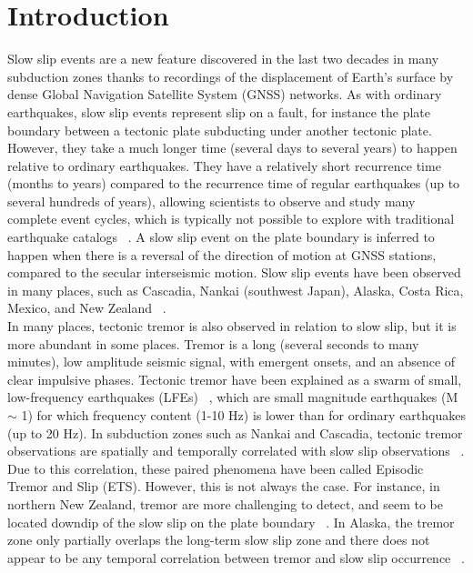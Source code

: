 \documentclass{article}
\begin{document}
\section{Introduction}

Slow slip events are a new feature discovered in the last two decades in many subduction zones thanks to recordings of the displacement of Earth's surface by dense Global Navigation Satellite System (GNSS) networks. As with ordinary earthquakes, slow slip events represent slip on a fault, for instance the plate boundary between a tectonic plate subducting under another tectonic plate. However, they take a much longer time (several days to several years) to happen relative to ordinary earthquakes. They have a relatively short recurrence time (months to years) compared to the recurrence time of regular earthquakes (up to several hundreds of years), allowing scientists to observe and study many complete event cycles, which is typically not possible to explore with traditional earthquake catalogs ~\citep{BER_2011}. A slow slip event on the plate boundary is inferred to happen when there is a reversal of the direction of motion at GNSS stations, compared to the secular interseismic motion. Slow slip events have been observed in many places, such as Cascadia, Nankai (southwest Japan), Alaska, Costa Rica, Mexico, and New Zealand ~\citep{BER_2011,AUD_2016}. \\

In many places, tectonic tremor is also observed in relation to slow slip, but it is more abundant in some places. Tremor is a long (several seconds to many minutes), low amplitude seismic signal, with emergent onsets, and an absence of clear impulsive phases. Tectonic tremor have been explained as a swarm of small, low-frequency earthquakes (LFEs) ~\citep{SHE_2007_nature}, which are small magnitude earthquakes (M $\sim$ 1) for which frequency content (1-10 Hz) is lower than for ordinary earthquakes (up to 20 Hz). In subduction zones such as Nankai and Cascadia, tectonic tremor observations are spatially and temporally correlated with slow slip observations ~\citep{OBA_2002,ROG_2003}. Due to this correlation, these paired phenomena have been called Episodic Tremor and Slip (ETS). However, this is not always the case. For instance, in northern New Zealand, tremor are more challenging to detect, and seem to be located downdip of the slow slip on the plate boundary ~\citep{TOD_2016}. In Alaska, the tremor zone only partially overlaps the long-term slow slip zone and there does not appear to be any temporal correlation between tremor and slow slip occurrence ~\citep{WEC_2016}. \\
\end{document}
